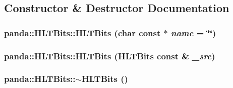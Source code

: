 \subsection{Constructor \& Destructor Documentation}
\hypertarget{classpanda_1_1HLTBits_a9bb54b0cde697b4eec5cdd529426d0aa}{
\subsubsection[{HLTBits}]{\setlength{\rightskip}{0pt plus 5cm}panda::HLTBits::HLTBits (char const $\ast$ {\em name} = {\ttfamily \char`\"{}\char`\"{}})}}
\label{classpanda_1_1HLTBits_a9bb54b0cde697b4eec5cdd529426d0aa}
\hypertarget{classpanda_1_1HLTBits_a2e76e64099e3edcfb52f78b3be8dd85f}{
\subsubsection[{HLTBits}]{\setlength{\rightskip}{0pt plus 5cm}panda::HLTBits::HLTBits ({\bf HLTBits} const \& {\em \_\-src})}}
\label{classpanda_1_1HLTBits_a2e76e64099e3edcfb52f78b3be8dd85f}
\hypertarget{classpanda_1_1HLTBits_a13c03f7e4df98e675cfad89c5647f949}{
\subsubsection[{$\sim$HLTBits}]{\setlength{\rightskip}{0pt plus 5cm}panda::HLTBits::$\sim$HLTBits ()}}
\label{classpanda_1_1HLTBits_a13c03f7e4df98e675cfad89c5647f949}


